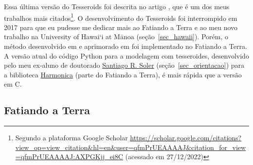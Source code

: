 \documentclass[12pt,a4paper,oneside]{book}
\newcommand{\UHM}{University of Hawai`i at M\={a}noa}
\newcommand{\SantiagoLink}{\href{https://www.santisoler.com/}{Santiago R. Soler}}
\begin{document}
Essa última versão do Tesseroids foi descrita no artigo \citet{Uieda2016}, que
é um dos meus trabalhos mais citados\footnote{Segundo a plataforma Google
Scholar
\url{https://scholar.google.com/citations?view_op=view_citation&hl=en&user=qfmPrUEAAAAJ&citation_for_view=qfmPrUEAAAAJ:AXPGKjj_ei8C}
(acessado em 27/12/2022)}.
O desenvolvimento do Tesseroids foi interrompido em 2017 para que eu pudesse me
dedicar mais ao Fatiando a Terra e ao meu novo trabalho na \UHM{}
(seção~\ref{sec_hawaii}).
Porém, o método desenvolvido em \citet{Uieda2016} e aprimorado em
\citet{Soler2019} foi implementado no Fatiando a Terra.
A versão atual do código Python para a modelagem com tesseroides, desenvolvido
pelo meu ex-aluno de doutorado \SantiagoLink{} (seção~\ref{sec_orientacao})
para a biblioteca \href{https://www.fatiando.org/harmonica/}{Harmonica} (parte
do Fatiando a Terra), é mais rápida que a versão em C.


\subsection{Fatiando a Terra}
\label{sec_fatiando}
\end{document}
